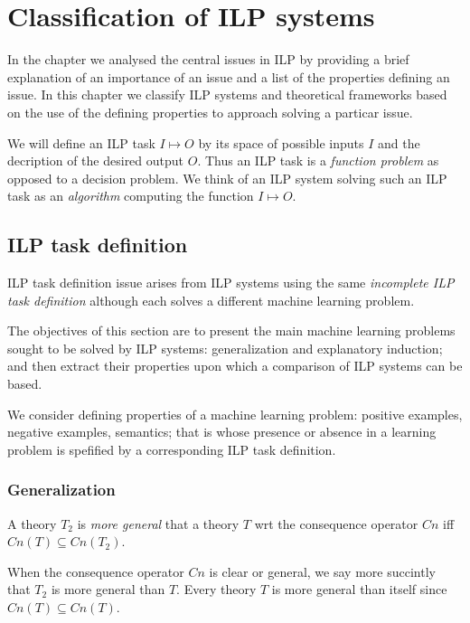 \chapter{Classification of ILP systems}\label{chap:classification_of_ilp_systems}

In the chapter  we analysed the central issues in ILP by providing a brief explanation of an importance of an issue and a list of the properties defining an issue. In this chapter we classify ILP systems and theoretical frameworks based on the use of the defining properties to approach solving a particar issue.

We will define an ILP task $I \mapsto O$ by its space of possible inputs $I$ and the decription of the desired output $O$. Thus an ILP task is a \emph{function problem} as opposed to a decision problem. We think of an ILP system solving such an ILP task as an \emph{algorithm} computing the function $I \mapsto O$.

\section{ILP task definition}\label{sec:ilp_task_definition}
ILP task definition issue arises from ILP systems using the same \emph{incomplete ILP task definition} although each solves a different machine learning problem.

The objectives of this section are to present the main machine learning problems sought to be solved by ILP systems: generalization and explanatory induction; and then extract their properties upon which a comparison of ILP systems can be based.

We consider defining properties of a machine learning problem: positive examples, negative examples, semantics; that is whose presence or absence in a learning problem is spefified by a corresponding ILP task definition.

\subsection{Generalization}\label{generalization}

\begin{defn}
A theory $T_2$ is \emph{more general} that a theory $T$ wrt the consequence operator $Cn$ iff $Cn(T) \subseteq Cn(T_2)$.
\end{defn}
When the consequence operator $Cn$ is clear or general, we say more succintly that $T_2$ is more general than $T$. Every theory $T$ is more general than itself since $Cn(T) \subseteq Cn(T)$.

